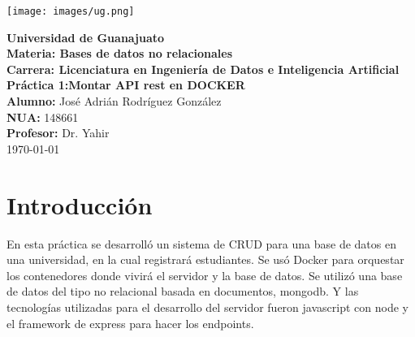 \documentclass[12pt,a4paper]{report}
\begin{document}
\begin{titlepage}
    \centering
    
    \texttt{[image: images/ug.png]}\par\vspace{1cm}
    
    {\Large \textbf{Universidad de Guanajuato}}\\[0.5cm]
    
    {\large \textbf{Materia: Bases de datos no relacionales}}\\[1cm]
    {\large \textbf{Carrera: Licenciatura en Ingeniería de Datos e Inteligencia Artificial}}\\[3cm]
    
    {\Huge \textbf{Práctica 1:Montar API rest en DOCKER}}\\[2cm]
    
    {\large \textbf{Alumno:} José Adrián Rodríguez González}\\[0.3cm]
    {\large \textbf{NUA:} 148661}\\[1.5cm]
    
    {\large \textbf{Profesor:} Dr. Yahir}\\[3cm]
    
    {\large \today}
    
    \vfill
\end{titlepage}

\tableofcontents %
\newpage

\chapter{Introducción}
En esta práctica se desarrolló un sistema de CRUD para una base de datos en una universidad, en la cual registrará estudiantes. Se usó Docker para orquestar los contenedores donde vivirá el servidor y la base de datos. Se utilizó una base de datos del tipo no relacional basada en documentos, mongodb. Y las tecnologías utilizadas para el desarrollo del servidor fueron javascript con node y el framework de express para hacer los endpoints.



\end{document}
